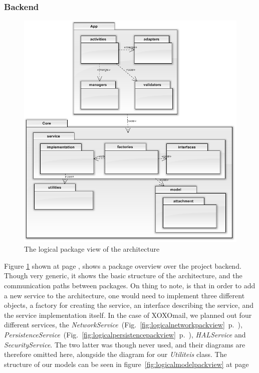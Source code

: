 	\subsubsection{Backend}
\begin{figure}[H]
	\includegraphics[width=\textwidth]{packageDiagram.png}
	\caption{The logical package view of the architecture}
	\label{fig:logicalpackview}
\end{figure}
Figure \ref{fig:logicalpackview} shown at page \pageref{fig:logicalpackview}, shows a package overview over the project backend. Though very generic, it shows the basic structure of the architecture, and the communication paths between packages. On thing to note, is that in order to add a new service to the architecture, one would need to implement three different objects, a factory for creating the service, an interface describing the service, and the service implementation itself. In the case of XOXOmail, we planned out four different services, the \textit{NetworkService}~(Fig.~\ref{fig:logicalnetworkpackview}~p.~\pageref{fig:logicalnetworkpackview}), \textit{PersistenceService}~(Fig.~\ref{fig:logicalpersistencepackview}~p.~\pageref{fig:logicalpersistencepackview}), \textit{HALService} and \textit{SecurityService}. The two latter was though never used, and their diagrams are therefore omitted here, alongside the diagram for our \textit{Utiliteis} class. The structure of our models can be seen in figure~\ref{fig:logicalmodelpackview} at page \pageref{fig:logicalmodelpackview}


